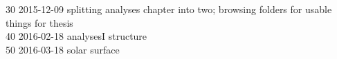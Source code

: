 \begin{footnotesize}
30	2015-12-09	splitting analyses chapter into two; browsing folders for usable things for thesis\\
40	2016-02-18	analysesI structure\\
50	2016-03-18	solar surface\\

\end{footnotesize}
